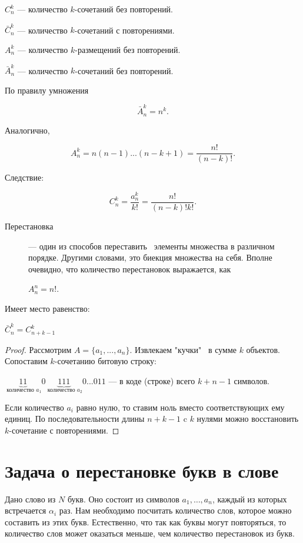 $C^k_n$ --- количество $k$-сочетаний без повторений.

$\bar{C}^k_n$ --- количество $k$-сочетаний с повторениями.

$A^k_n$ --- количество $k$-размещений без повторений.

$\bar{A}^k_n$ --- количество $k$-сочетаний без повторений.


По правилу умножения

\[ \bar{A}^k_n  = n^k .\]

Аналогично, 

\[ A^k_n = n(n-1) ... (n-k+1) = \frac {n!} {(n-k)!} .\]

Следствие:

\[ C^k_n = \frac{a^k_n} {k!} = \frac {n!} {(n-k)! k!} .\]

\begin{description}
\item[Перестановка] --- один из способов переставить \ элементы множества в различном порядке. Другими словами, это биекция множества на себя. Вполне очевидно, что количество перестановок выражается, как

$ A^n_n = n!$.

\end{description}

\begin{alem} Имеет место равенство:

$ \bar{C}^k_n = C^k_{n+k-1}$

\end{alem}

\begin{proof} 

Рассмотрим $ A = \{a_1, ..., a_n\} $. Извлекаем "кучки" \  в сумме $k$ объектов. 
Сопоставим $k$-сочетанию битовую строку:

$
\underbrace {11} _{\text{ количество } a_1} 0 
\underbrace {111} _{\text{ количество } a_2} 0...011$ --- в коде (строке) всего $ k+n-1 $ символов.

Если количество $a_i$ равно нулю, то ставим ноль вместо соответствующих ему единиц. По последовательности длины $n+k-1$ c $k$ нулями можно восстановить $k$-сочетание с повторениями. 
\end{proof}
 
\section{Задача о перестановке букв в слове}
Дано слово из $N$ букв. Оно состоит из символов $a_1, \dots, a_n$, каждый из которых встречается $\alpha_i$ раз. Нам необходимо посчитать количество слов, которое можно составить из этих букв. Естественно, что так как буквы могут повторяться, то количество слов может оказаться меньше, чем количество перестановок из букв.
 
